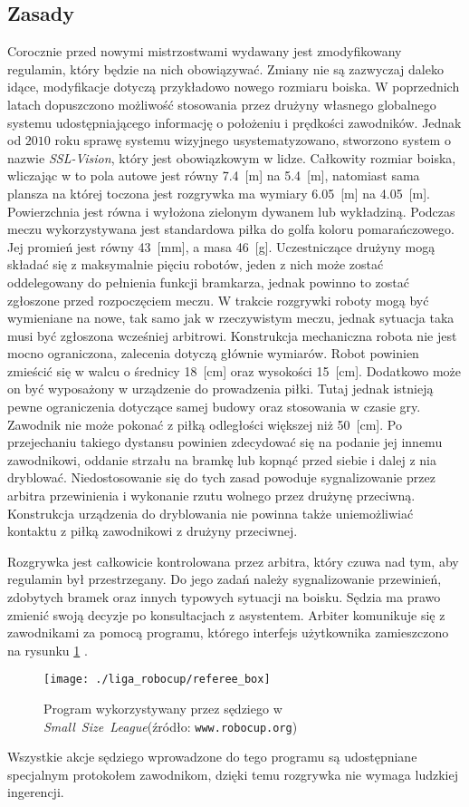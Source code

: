 	\subsection{Zasady}
	Corocznie przed nowymi mistrzostwami wydawany jest zmodyfikowany regulamin, który będzie na nich obowiązywać. Zmiany nie są zazwyczaj daleko idące, modyfikacje dotyczą przykładowo nowego rozmiaru boiska.
	W poprzednich latach dopuszczono możliwość stosowania przez drużyny własnego globalnego systemu udostępniającego informację o położeniu i prędkości zawodników.
	Jednak od $2010$ roku sprawę systemu wizyjnego usystematyzowano, stworzono system o nazwie \textit{SSL-Vision}, który jest obowiązkowym w lidze. 
	Całkowity rozmiar boiska, wliczając w to pola autowe jest równy 7.4~[m] na 5.4~[m], natomiast sama plansza na której toczona jest rozgrywka ma wymiary 6.05~[m] na 4.05~[m].
	Powierzchnia jest równa i  wyłożona zielonym dywanem lub wykładziną. Podczas meczu wykorzystywana jest standardowa piłka do golfa koloru pomarańczowego. Jej promień jest równy 43~[mm], a masa
	46~[g].
	Uczestniczące drużyny mogą składać się z maksymalnie pięciu robotów, jeden z nich może zostać oddelegowany do pełnienia
	funkcji bramkarza, jednak powinno to zostać zgłoszone przed rozpoczęciem meczu. W trakcie rozgrywki roboty mogą być wymieniane na nowe, tak samo jak w rzeczywistym meczu, jednak 
	sytuacja taka musi być zgłoszona wcześniej arbitrowi.
	Konstrukcja mechaniczna robota nie jest mocno ograniczona, zalecenia dotyczą głównie wymiarów. Robot powinien zmieścić się w walcu o średnicy 18~[cm] oraz wysokości 15~[cm].
	Dodatkowo może on być wyposażony w urządzenie do prowadzenia piłki. Tutaj jednak istnieją pewne ograniczenia dotyczące
	samej budowy oraz stosowania w czasie gry. Zawodnik nie może pokonać z piłką odległości większej niż 50~[cm]. Po przejechaniu takiego dystansu powinien zdecydować się
	na podanie jej innemu zawodnikowi, oddanie strzału na bramkę lub kopnąć przed siebie i dalej z nia dryblować. Niedostosowanie się do tych zasad powoduje sygnalizowanie przez arbitra
	przewinienia i wykonanie rzutu wolnego przez drużynę przeciwną. Konstrukcja urządzenia do dryblowania nie powinna także uniemożliwiać kontaktu z piłką zawodnikowi z drużyny przeciwnej.
		
	Rozgrywka jest całkowicie kontrolowana przez arbitra, który czuwa nad tym, aby  regulamin był przestrzegany. Do
	jego zadań należy sygnalizowanie przewinień, zdobytych bramek oraz innych typowych sytuacji na boisku.
	Sędzia ma prawo zmienić swoją decyzje po konsultacjach z asystentem. Arbiter komunikuje się z zawodnikami za pomocą programu, którego interfejs użytkownika zamieszczono na rysunku \ref{fig:referee_box} .
	\begin{figure}[H]
	\centering
	\texttt{[image: ./liga\_robocup/referee\_box]}
	\caption{Program wykorzystywany przez sędziego w  \mbox{\emph{Small Size League}}\newline(źródło: \texttt{www.robocup.org}) }
	\label{fig:referee_box}
	\end{figure} 
	Wszystkie akcje sędziego wprowadzone do tego programu są udostępniane specjalnym protokołem zawodnikom, dzięki temu rozgrywka nie wymaga ludzkiej ingerencji.
